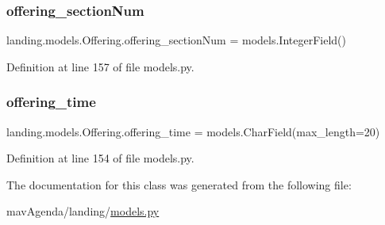 \subsubsection{\texorpdfstring{offering\+\_\+section\+Num}{offering\_sectionNum}}
{\footnotesize\ttfamily landing.\+models.\+Offering.\+offering\+\_\+section\+Num = models.\+Integer\+Field()\hspace{0.3cm}{\ttfamily [static]}}



Definition at line 157 of file models.\+py.

\mbox{\label{classlanding_1_1models_1_1Offering_a546aca2445d9fabd2dac01b7230f93f5}} 
\subsubsection{\texorpdfstring{offering\+\_\+time}{offering\_time}}
{\footnotesize\ttfamily landing.\+models.\+Offering.\+offering\+\_\+time = models.\+Char\+Field(max\+\_\+length=20)\hspace{0.3cm}{\ttfamily [static]}}



Definition at line 154 of file models.\+py.



The documentation for this class was generated from the following file\+:\begin{DoxyCompactItemize}
\item 
mav\+Agenda/landing/\mbox{\hyperlink{models_8py}{models.\+py}}\end{DoxyCompactItemize}
